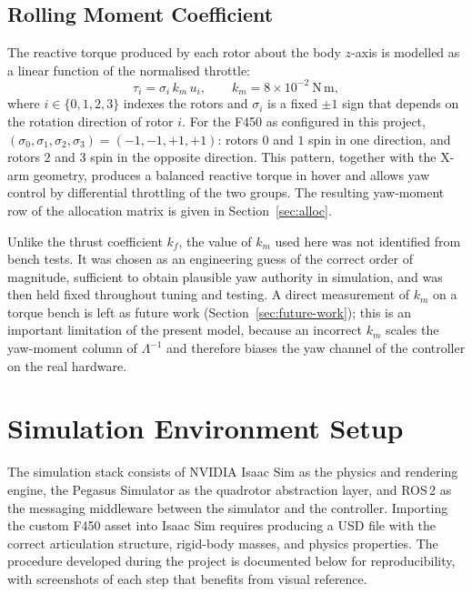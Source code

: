 \documentclass[11pt]{article}
\theoremstyle{remark}
\begin{document}
\subsection{Rolling Moment Coefficient}
\label{sec:moment-coefficient}
The reactive torque produced by each rotor about the body $z$-axis is modelled as a linear function of the normalised throttle:
\begin{equation}
    \tau_i = \sigma_i\, k_m\, u_i, \qquad k_m = 8\times 10^{-2}~\mathrm{N\,m},
    \label{eq:moment-curve}
\end{equation}
where $i \in \{0, 1, 2, 3\}$ indexes the rotors and $\sigma_i$ is a fixed $\pm 1$ sign that depends on the rotation direction of rotor $i$. For the F450 as configured in this project, $(\sigma_0, \sigma_1, \sigma_2, \sigma_3) = (-1, -1, +1, +1)$: rotors $0$ and $1$ spin in one direction, and rotors $2$ and $3$ spin in the opposite direction. This pattern, together with the X-arm geometry, produces a balanced reactive torque in hover and allows yaw control by differential throttling of the two groups. The resulting yaw-moment row of the allocation matrix is given in Section~\ref{sec:alloc}.

Unlike the thrust coefficient $k_f$, the value of $k_m$ used here was not identified from bench tests. It was chosen as an engineering guess of the correct order of magnitude, sufficient to obtain plausible yaw authority in simulation, and was then held fixed throughout tuning and testing. A direct measurement of $k_m$ on a torque bench is left as future work (Section~\ref{sec:future-work}); this is an important limitation of the present model, because an incorrect $k_m$ scales the yaw-moment column of $\Lambda^{-1}$ and therefore biases the yaw channel of the controller on the real hardware.

\section{Simulation Environment Setup}
\label{sec:simulation-setup}

The simulation stack consists of NVIDIA Isaac Sim as the physics and rendering engine, the Pegasus Simulator as the quadrotor abstraction layer, and ROS\,2 as the messaging middleware between the simulator and the controller. Importing the custom F450 asset into Isaac Sim requires producing a USD file with the correct articulation structure, rigid-body masses, and physics properties. The procedure developed during the project is documented below for reproducibility, with screenshots of each step that benefits from visual reference.
\end{document}
